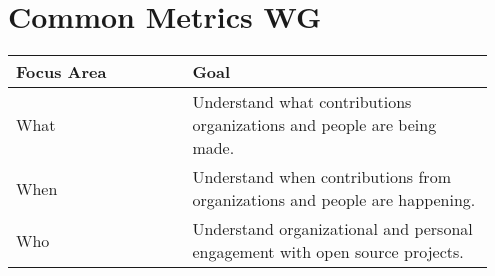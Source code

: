 

\section{Common Metrics WG}
\begin{table}[ht!]
    \centering
    \begin{tabular}{|p{0.35\linewidth} | p{0.6\linewidth}|}
        \hline
        \hfil \textbf{Focus Area}  & \hfil \textbf{Goal} \\
        \hline
		What & Understand what contributions organizations and people are being made. \\ 
		\hline
		When & Understand when contributions from organizations and people are happening. \\ 
		\hline
		Who & Understand organizational and personal engagement with open source projects. \\ 
		\hline
    \end{tabular}
\end{table}

\clearpage
 
 
 
